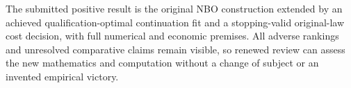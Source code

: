 \documentclass[ecta,nameyear,draft]{econsocart}
\begin{document}
The submitted positive result is the original NBO construction extended
by an achieved qualification-optimal continuation fit and a
stopping-valid original-law cost decision, with full numerical and
economic premises. All adverse rankings and unresolved comparative
claims remain visible, so renewed review can assess the new mathematics
and computation without a change of subject or an invented empirical
victory.
\end{document}
